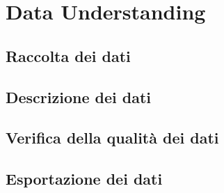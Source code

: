 \section{Data Understanding}

\subsection{Raccolta dei dati}

\subsection{Descrizione dei dati}

\subsection{Verifica della qualità dei dati}

\subsection{Esportazione dei dati}

